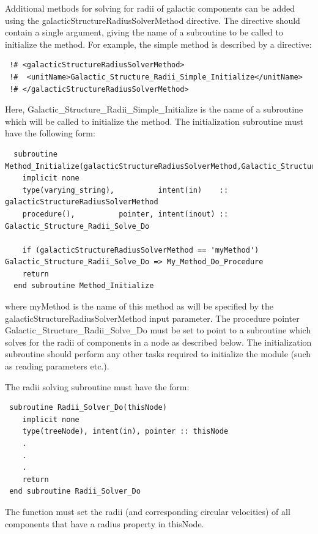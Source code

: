 Additional methods for solving for radii of galactic components can be added using the {\normalfont \ttfamily galacticStructureRadiusSolverMethod} directive. The directive should contain a single argument, giving the name of a subroutine to be called to initialize the method. For example, the {\normalfont \ttfamily simple} method is described by a directive:
\begin{verbatim}
 !# <galacticStructureRadiusSolverMethod>
 !#  <unitName>Galactic_Structure_Radii_Simple_Initialize</unitName>
 !# </galacticStructureRadiusSolverMethod>
\end{verbatim}
Here, {\normalfont \ttfamily Galactic\_Structure\_Radii\_Simple\_Initialize} is the name of a subroutine which will be called to initialize the method. The initialization subroutine must have the following form:
\begin{verbatim}
  subroutine Method_Initialize(galacticStructureRadiusSolverMethod,Galactic_Structure_Radii_Solve_Do)
    implicit none
    type(varying_string),          intent(in)    :: galacticStructureRadiusSolverMethod
    procedure(),          pointer, intent(inout) :: Galactic_Structure_Radii_Solve_Do
    
    if (galacticStructureRadiusSolverMethod == 'myMethod') Galactic_Structure_Radii_Solve_Do => My_Method_Do_Procedure
    return
  end subroutine Method_Initialize
\end{verbatim}
where {\normalfont \ttfamily myMethod} is the name of this method as will be specified by the {\normalfont \ttfamily galacticStructureRadiusSolverMethod} input parameter. The procedure pointer {\normalfont \ttfamily Galactic\_Structure\_Radii\_Solve\_Do} must be set to point to a subroutine which solves for the radii of components in a node as described below. The initialization subroutine should perform any other tasks required to initialize the module (such as reading parameters etc.).

The radii solving subroutine must have the form:
\begin{verbatim}
 subroutine Radii_Solver_Do(thisNode)
    implicit none
    type(treeNode), intent(in), pointer :: thisNode
    .
    .
    .
    return
 end subroutine Radii_Solver_Do
\end{verbatim}
The function must set the radii (and corresponding circular velocities) of all components that have a radius property in {\normalfont \ttfamily thisNode}.

